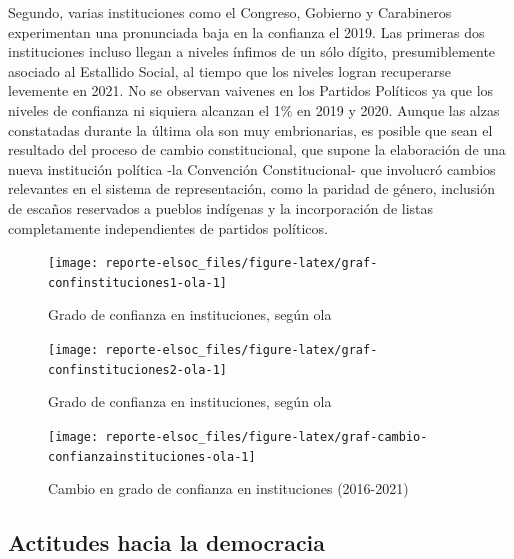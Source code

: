 \documentclass[
  12pt,
]{book}
\begin{document}
Segundo, varias instituciones como el Congreso, Gobierno y Carabineros experimentan una pronunciada baja en la confianza el 2019. Las primeras dos instituciones incluso llegan a niveles ínfimos de un sólo dígito, presumiblemente asociado al Estallido Social, al tiempo que los niveles logran recuperarse levemente en 2021. No se observan vaivenes en los Partidos Políticos ya que los niveles de confianza ni siquiera alcanzan el 1\% en 2019 y 2020. Aunque las alzas constatadas durante la última ola son muy embrionarias, es posible que sean el resultado del proceso de cambio constitucional, que supone la elaboración de una nueva institución política -la Convención Constitucional- que involucró cambios relevantes en el sistema de representación, como la paridad de género, inclusión de escaños reservados a pueblos indígenas y la incorporación de listas completamente independientes de partidos políticos.

\begin{figure}

{\centering \texttt{[image: reporte-elsoc\_files/figure-latex/graf-confinstituciones1-ola-1]} 

}

\caption{Grado de confianza en instituciones, según ola}\label{fig:graf-confinstituciones1-ola}
\end{figure}

\begin{figure}

{\centering \texttt{[image: reporte-elsoc\_files/figure-latex/graf-confinstituciones2-ola-1]} 

}

\caption{Grado de confianza en instituciones, según ola}\label{fig:graf-confinstituciones2-ola}
\end{figure}

\begin{figure}

{\centering \texttt{[image: reporte-elsoc\_files/figure-latex/graf-cambio-confianzainstituciones-ola-1]} 

}

\caption{Cambio en grado de confianza en instituciones (2016-2021)}\label{fig:graf-cambio-confianzainstituciones-ola}
\end{figure}

\hypertarget{actitudes-hacia-la-democracia}{%
\subsection{Actitudes hacia la democracia}\label{actitudes-hacia-la-democracia}}
\end{document}
